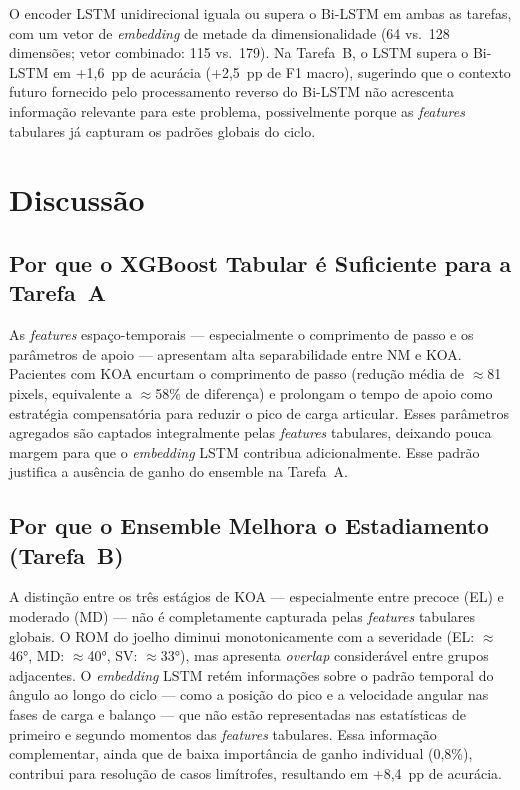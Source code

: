 \documentclass[a4paper,12pt]{article}
\begin{document}
O encoder LSTM unidirecional iguala ou supera o Bi-LSTM em ambas as tarefas, com um
vetor de \textit{embedding} de metade da dimensionalidade (64 vs.\ 128 dimensões;
vetor combinado: 115 vs.\ 179). Na Tarefa~B, o LSTM supera o Bi-LSTM em
+1,6~pp de acurácia (+2,5~pp de F1 macro), sugerindo que o contexto futuro
fornecido pelo processamento reverso do Bi-LSTM não acrescenta informação relevante
para este problema, possivelmente porque as \textit{features} tabulares já capturam
os padrões globais do ciclo.

\section{Discussão}
\label{sec:disc}

\subsection{Por que o XGBoost Tabular é Suficiente para a Tarefa~A}

As \textit{features} espaço-temporais --- especialmente o comprimento de passo e os
parâmetros de apoio --- apresentam alta separabilidade entre NM e KOA. Pacientes com
KOA encurtam o comprimento de passo (redução média de $\approx$81 pixels,
equivalente a $\approx$58\% de diferença) e prolongam o tempo de apoio como
estratégia compensatória para reduzir o pico de carga articular. Esses parâmetros
agregados são captados integralmente pelas \textit{features} tabulares, deixando
pouca margem para que o \textit{embedding} LSTM contribua adicionalmente. Esse
padrão justifica a ausência de ganho do ensemble na Tarefa~A.

\subsection{Por que o Ensemble Melhora o Estadiamento (Tarefa~B)}

A distinção entre os três estágios de KOA --- especialmente entre precoce (EL) e
moderado (MD) --- não é completamente capturada pelas \textit{features} tabulares
globais. O ROM do joelho diminui monotonicamente com a severidade
(EL: $\approx$46°, MD: $\approx$40°, SV: $\approx$33°), mas apresenta
\textit{overlap} considerável entre grupos adjacentes. O \textit{embedding} LSTM
retém informações sobre o padrão temporal do ângulo ao longo do ciclo --- como a
posição do pico e a velocidade angular nas fases de carga e balanço --- que não estão
representadas nas estatísticas de primeiro e segundo momentos das \textit{features}
tabulares. Essa informação complementar, ainda que de baixa importância de ganho
individual (0,8\%), contribui para resolução de casos limítrofes, resultando em
+8,4~pp de acurácia.
\end{document}
